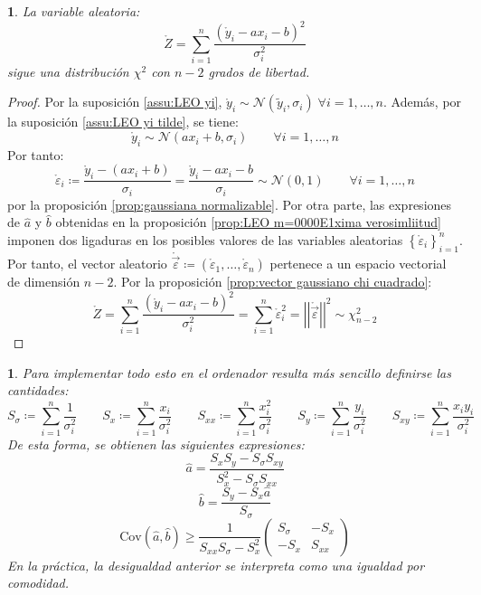 \documentclass[11pt,a4paper,spanish]{article}
\numberwithin{equation}{section}
\numberwithin{table}{section}
\numberwithin{figure}{section}
\theoremstyle{definition}
\theoremstyle{remark}
\theoremstyle{definition}
\theoremstyle{remark}
\theoremstyle{plain}
\newtheorem{prop}{\protect\propositionname}[section]
\theoremstyle{plain}
\theoremstyle{plain}
\theoremstyle{plain}
\theoremstyle{plain}
\theoremstyle{plain}
\newtheorem{lyxalgorithm}{\protect\algorithmname}[section]
\providecommand{\algorithmname}{Implementación en el ordenador}
\providecommand{\algorithmname}{Algoritmo}
\providecommand{\propositionname}{Proposición}
\begin{document}
	\begin{prop}
		La variable aleatoria:
		\[
		\mathring{Z}=\sum_{i=1}^{n}\frac{\left(\mathring{y}_{i}-ax_{i}-b\right)^{2}}{\sigma_{i}^{2}}
		\]
		sigue una distribución $\chi^{2}$ con $n-2$ grados de libertad.
	\end{prop}
	\begin{proof}
		Por la suposición \vref{assu:LEO yi}, $\mathring{y}_{i}\sim\mathcal{N}\left(\tilde{y}_{i},\sigma_{i}\right)\;\forall i=1,\dots,n$.
		Además, por la suposición \vref{assu:LEO yi tilde}, se tiene:
		\[
		\mathring{y}_{i}\sim\mathcal{N}\left(ax_{i}+b,\sigma_{i}\right)\qquad\forall i=1,\dots,n
		\]
		Por tanto:
		\[
		\mathring{\varepsilon}_{i}\coloneqq\frac{\mathring{y}_{i}-\left(ax_{i}+b\right)}{\sigma_{i}}=\frac{\mathring{y}_{i}-ax_{i}-b}{\sigma_{i}}\sim\mathcal{N}\left(0,1\right)\qquad\forall i=1,\dots,n
		\]
		por la proposición \vref{prop:gaussiana normalizable}. Por otra parte,
		las expresiones de $\hat{a}$ y $\hat{b}$ obtenidas en la proposición
		\vref{prop:LEO m=0000E1xima verosimliitud} imponen dos ligaduras
		en los posibles valores de las variables aleatorias $\left\{ \mathring{\varepsilon}_{i}\right\} _{i=1}^{n}$.
		Por tanto, el vector aleatorio $\mathring{\vec{\varepsilon}}\coloneqq\left(\mathring{\varepsilon}_{1},\dots,\mathring{\varepsilon}_{n}\right)$
		pertenece a un espacio vectorial de dimensión $n-2$. Por la proposición
		\vref{prop:vector gaussiano chi cuadrado}:
		\[
		\mathring{Z}=\sum_{i=1}^{n}\frac{\left(\mathring{y}_{i}-ax_{i}-b\right)^{2}}{\sigma_{i}^{2}}=\sum_{i=1}^{n}\mathring{\varepsilon}_{i}^{2}=\left|\left|\mathring{\vec{\varepsilon}}\right|\right|^{2}\sim\chi_{n-2}^{2}
		\]
	\end{proof}
	\begin{lyxalgorithm}
		Para implementar todo esto en el ordenador resulta más sencillo definirse
		las cantidades:
		\[
		S_{\sigma}\coloneqq\sum_{i=1}^{n}\frac{1}{\sigma_{i}^{2}}\qquad S_{x}\coloneqq\sum_{i=1}^{n}\frac{x_{i}}{\sigma_{i}^{2}}\qquad S_{xx}\coloneqq\sum_{i=1}^{n}\frac{x_{i}^{2}}{\sigma_{i}^{2}}\qquad S_{y}\coloneqq\sum_{i=1}^{n}\frac{y_{i}}{\sigma_{i}^{2}}\qquad S_{xy}\coloneqq\sum_{i=1}^{n}\frac{x_{i}y_{i}}{\sigma_{i}^{2}}
		\]
		De esta forma, se obtienen las siguientes expresiones:
		\[
		\hat{a}=\frac{S_{x}S_{y}-S_{\sigma}S_{xy}}{S_{x}^{2}-S_{\sigma}S_{xx}}
		\]
		\[
		\hat{b}=\frac{S_{y}-S_{x}\hat{a}}{S_{\sigma}}
		\]
		\[
		\mathrm{Cov}\left(\hat{a},\hat{b}\right)\ge\frac{1}{S_{xx}S_{\sigma}-S_{x}^{2}}\left(\begin{matrix}S_{\sigma} & -S_{x}\\
			-S_{x} & S_{xx}
		\end{matrix}\right)
		\]
		En la práctica, la desigualdad anterior se interpreta como una igualdad
		por comodidad.
	\end{lyxalgorithm}
	
\end{document}
